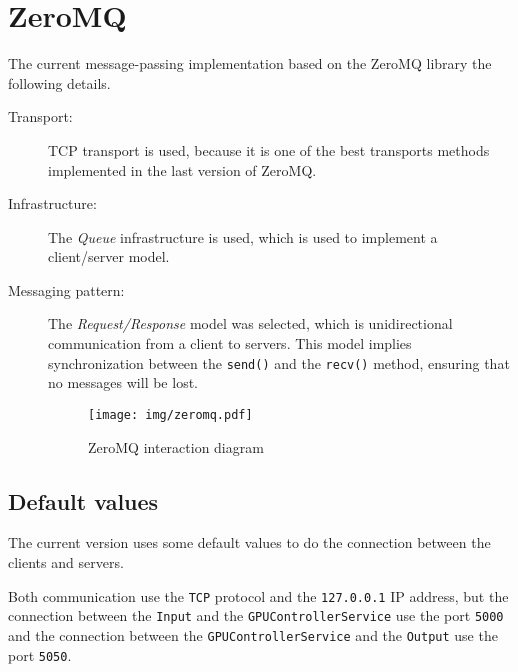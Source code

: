\section{ZeroMQ}

The current message-passing implementation based on the ZeroMQ library
 the following details.

\begin{description}
    \item [Transport:]
        TCP transport is used,
        because it is one of the best transports methods implemented
        in the last version of ZeroMQ.
    \item [Infrastructure:]
        The \emph{Queue} infrastructure is used,
        which is used to implement a client/server model.
    \item [Messaging pattern:]
        The \emph{Request/Response} model was selected,
        which is unidirectional communication from a client
        to servers. This model implies synchronization between the \texttt{send()}
        and the \texttt{recv()} method, ensuring that no messages will be lost.
        \begin{figure}[h!]
            \centering
            \texttt{[image: img/zeromq.pdf]}
            \caption{ZeroMQ interaction diagram}
        \end{figure}
\end{description}

\subsection*{Default values}

The current version uses some default values to do the
connection between the clients and servers.

Both communication use the \texttt{TCP} protocol
and the \texttt{127.0.0.1} IP address,
but the connection between the \texttt{Input} and the \texttt{GPUControllerService}
use the port \texttt{5000} and the connection between the \texttt{GPUControllerService}
and the \texttt{Output} use the port \texttt{5050}.
